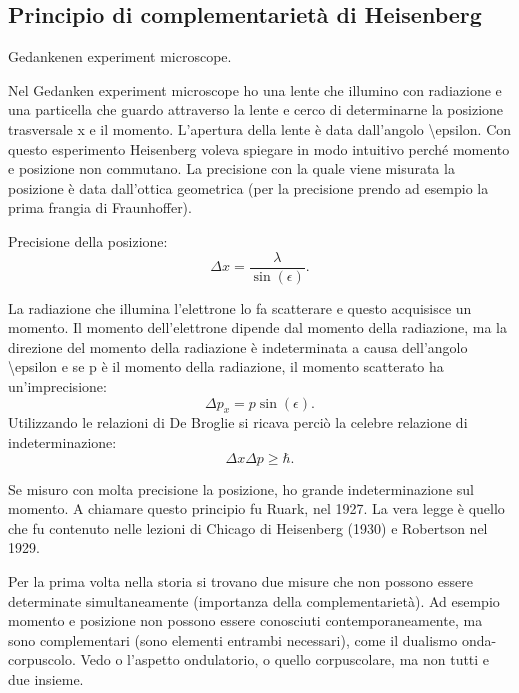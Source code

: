 \subsection[Principio di complementarietà]{Principio di complementarietà di Heisenberg} %
\label{subsec:complementariet=0000E0_heisenberg} Gedankenen experiment
microscope.
 
Nel Gedanken experiment microscope ho una lente che illumino con radiazione
e una particella che guardo attraverso la lente e cerco di determinarne
la posizione trasversale x e il momento. L'apertura della lente è
data dall'angolo \textbackslash{}epsilon. Con questo esperimento Heisenberg
voleva spiegare in modo intuitivo perché momento e posizione non commutano.
La precisione con la quale viene misurata la posizione è data dall'ottica
geometrica (per la precisione prendo ad esempio la prima frangia di
Fraunhoffer). 

Precisione della posizione: 
\begin{equation}
\Delta x=\frac{\lambda}{\sin{\left(\epsilon\right)}}.
\end{equation}


La radiazione che illumina l'elettrone lo fa scatterare e questo acquisisce
un momento. Il momento dell'elettrone dipende dal momento della radiazione,
ma la direzione del momento della radiazione è indeterminata a causa
dell'angolo \textbackslash{}epsilon e se p è il momento della radiazione,
il momento scatterato ha un'imprecisione: 
\begin{equation}
\Delta p_{x}=p\sin{\left(\epsilon\right)}.
\end{equation}
 Utilizzando le relazioni di De Broglie si ricava perciò la celebre
relazione di indeterminazione: 
\begin{equation}
\Delta x\Delta p\ge\hbar.
\end{equation}


Se misuro con molta precisione la posizione, ho grande indeterminazione
sul momento. A chiamare questo principio fu Ruark, nel 1927. La vera
legge è quello che fu contenuto nelle lezioni di Chicago di Heisenberg
(1930) e Robertson nel 1929. 

Per la prima volta nella storia si trovano due misure che non possono
essere determinate simultaneamente (importanza della complementarietà).
Ad esempio momento e posizione non possono essere conosciuti contemporaneamente,
ma sono complementari (sono elementi entrambi necessari), come il
dualismo onda-corpuscolo. Vedo o l'aspetto ondulatorio, o quello corpuscolare,
ma non tutti e due insieme.

%